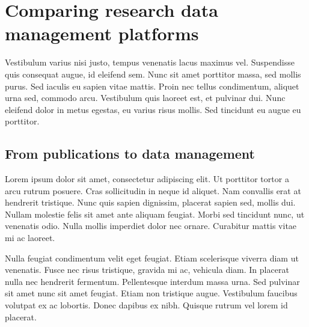
\section{Comparing research data management platforms} %
\label{sec:comparing_research_data_management_platforms}

Vestibulum varius nisi justo, tempus venenatis lacus maximus vel. Suspendisse quis consequat augue, id eleifend sem. Nunc sit amet porttitor massa, sed mollis purus. Sed iaculis eu sapien vitae mattis. Proin nec tellus condimentum, aliquet urna sed, commodo arcu. Vestibulum quis laoreet est, et pulvinar dui. Nunc eleifend dolor in metus egestas, eu varius risus mollis. Sed tincidunt eu augue eu porttitor.

\subsection{From publications to data management} %
\label{sub:from_publications_to_data_management}

Lorem ipsum dolor sit amet, consectetur adipiscing elit. Ut porttitor tortor a arcu rutrum posuere. Cras sollicitudin in neque id aliquet. Nam convallis erat at hendrerit tristique. Nunc quis sapien dignissim, placerat sapien sed, mollis dui. Nullam molestie felis sit amet ante aliquam feugiat. Morbi sed tincidunt nunc, ut venenatis odio. Nulla mollis imperdiet dolor nec ornare. Curabitur mattis vitae mi ac laoreet.

Nulla feugiat condimentum velit eget feugiat. Etiam scelerisque viverra diam ut venenatis. Fusce nec risus tristique, gravida mi ac, vehicula diam. In placerat nulla nec hendrerit fermentum. Pellentesque interdum massa urna. Sed pulvinar sit amet nunc sit amet feugiat. Etiam non tristique augue. Vestibulum faucibus volutpat ex ac lobortis. Donec dapibus ex nibh. Quisque rutrum vel lorem id placerat.

